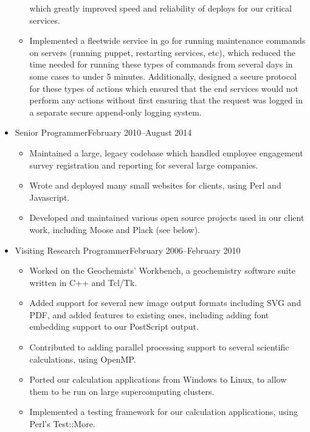 \documentclass[letterpaper]{article}
\begin{document}
\begin{itemize}
\begin{itemize}
                which greatly improved speed and reliability of deploys for
                our critical services.
            \item Implemented a fleetwide service in go for running
                maintenance commands on servers (running puppet, restarting
                services, etc), which reduced the time needed for running
                these types of commands from several days in some cases to
                under 5 minutes. Additionally, designed a secure protocol for
                these types of actions which ensured that the end services
                would not perform any actions without first ensuring that the
                request was logged in a separate secure append-only logging
                system.
        \end{itemize}
    \item {}
                        {Senior Programmer}{February 2010--August 2014}
        \begin{itemize}
            \item Maintained a large, legacy codebase which handled employee
                engagement survey registration and reporting for several large
                companies.
            \item Wrote and deployed many small websites for clients, using
                Perl and Javascript.
            \item Developed and maintained various open source projects used in
                our client work, including Moose and Plack (see below).
        \end{itemize}
    \item {}
                        {Visiting Research Programmer}{February 2006--February 2010}
        \begin{itemize}
            \item Worked on the Geochemists' Workbench, a geochemistry software
                suite written in C++ and Tcl/Tk.
            \item Added support for several new image output formats including
                SVG and PDF, and added features to existing ones, including
                adding font embedding support to our PostScript output.
            \item Contributed to adding parallel processing support to several
                scientific calculations, using OpenMP.
            \item Ported our calculation applications from Windows to Linux, to
                allow them to be run on large supercomputing clusters.
            \item Implemented a testing framework for our calculation
                applications, using Perl's Test::More.
        \end{itemize}
\end{itemize}
\end{document}
